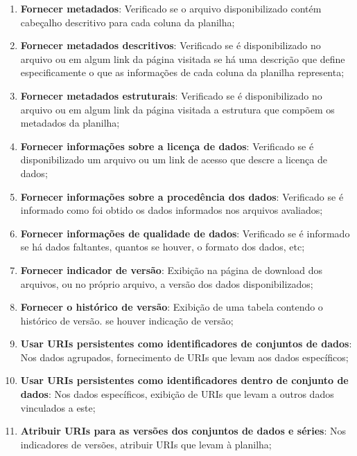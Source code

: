 \begin{enumerate}

    \item \textbf{Fornecer metadados}: Verificado se o arquivo disponibilizado contém cabeçalho descritivo para cada coluna da planilha;
    
    \item \textbf{Fornecer metadados descritivos}: Verificado se é disponibilizado no arquivo ou em algum link da página visitada se há uma descrição que define especificamente o que as informações de cada coluna da planilha representa;

    \item \textbf{Fornecer metadados estruturais}: Verificado se é disponibilizado no arquivo ou em algum link da página visitada a estrutura que compõem os metadados da planilha;

    \item \textbf{Fornecer informações sobre a licença de dados}: Verificado se é disponibilizado um arquivo ou um link de acesso que descre a licença de dados;

    \item \textbf{Fornecer informações sobre a procedência dos dados}: Verificado se é informado como foi obtido os dados informados nos arquivos avaliados;

    \item \textbf{Fornecer informações de qualidade de dados}: Verificado se é informado se há dados faltantes, quantos se houver, o formato dos dados, etc;

    \item \textbf{Fornecer indicador de versão}: Exibição na página de download dos arquivos, ou no próprio arquivo, a versão dos dados disponibilizados;

    \item \textbf{Fornecer o histórico de versão}: Exibição de uma tabela contendo o histórico de versão. se houver indicação de versão;

    \item \textbf{Usar URIs persistentes como identificadores de conjuntos de dados}: Nos dados agrupados, fornecimento de URIs que levam aos dados específicos;

    \item \textbf{Usar URIs persistentes como identificadores dentro de conjunto de dados}: Nos dados específicos, exibição de URIs que levam a outros dados vinculados a este;

    \item \textbf{Atribuir URIs para as versões dos conjuntos de dados e séries}: Nos indicadores de versões, atribuir URIs que levam à planilha;


\end{enumerate}

